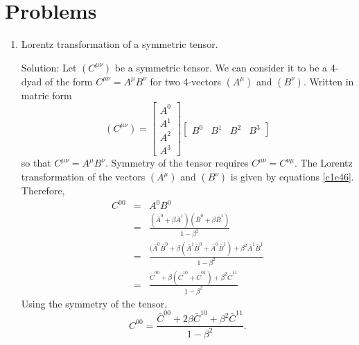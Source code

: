 \section{Problems}
\begin{enumerate}
\item Lorentz transformation of a symmetric tensor. 
\item[Solution:] Let $(C^{\mu\nu})$ be a symmetric tensor. We can consider it to
be a 4-dyad of the form $C^{\mu\nu} = A^\mu B^\nu$ for two 4-vectors $(A^\mu)$ 
and $(B^\nu)$. Written in matric form
\begin{equation}\label{c1e87}
(C^{\mu\nu}) = \begin{bmatrix}A^0 \\ A^1 \\ A^2 \\ A^3\end{bmatrix}
\begin{bmatrix}B^0 & B^1 & B^2 & B^3 \end{bmatrix}
\end{equation}
so that $C^{\mu\nu} = A^\mu B^\nu$. Symmetry of the tensor requires $C^{\mu\nu}
= C^{\nu\mu}$. The Lorentz transformation of the vectors $(A^\mu)$ and $(B^\nu)$
is given by equations \eqref{c1e46}. Therefore,
\begin{eqnarray*}
C^{00} &=& A^0 B^0 \\
 &=& \frac{(\bar{A}^0 + \beta\bar{A}^1)(\bar{B}^0 + \beta\bar{B}^1)}{1 - \beta^2} \\
 &=& \frac{(\bar{A}^0\bar{B}^0 + \beta(\bar{A}^1\bar{B}^0 + \bar{A}^0\bar{B}^1) + \beta^2\bar{A}^1\bar{B}^1}{1 - \beta^2} \\
 &=& \frac{\bar{C}^{00} + \beta(\bar{C}^{10} + \bar{C}^{01}) + \beta^2\bar{C}^{11}}{1 - \beta^2}
\end{eqnarray*}
Using the symmetry of the tensor,
\begin{equation}\label{c1e88}
C^{00} = \frac{\bar{C}^{00} + 2\beta\bar{C}^{10} + \beta^2\bar{C}^{11}}{1 - \beta^2}.
\end{equation}
\end{enumerate}
